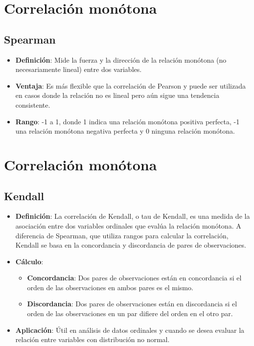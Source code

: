\documentclass[
  letterpaper,
  DIV=11,
  numbers=noendperiod]{scrreprt}
\providecommand{\tightlist}{%
  \setlength{\itemsep}{0pt}\setlength{\parskip}{0pt}}\usepackage{longtable,booktabs,array}
\begin{document}
\section{Correlación monótona}\label{correlaciuxf3n-monuxf3tona}

\subsection{Spearman}\label{spearman}

\begin{itemize}
\tightlist
\item
  \textbf{Definición}: Mide la fuerza y la dirección de la relación
  monótona (no necesariamente lineal) entre dos variables.
\item
  \textbf{Ventaja}: Es más flexible que la correlación de Pearson y
  puede ser utilizada en casos donde la relación no es lineal pero aún
  sigue una tendencia consistente.
\item
  \textbf{Rango}: -1 a 1, donde 1 indica una relación monótona positiva
  perfecta, -1 una relación monótona negativa perfecta y 0 ninguna
  relación monótona.
\end{itemize}

\section{Correlación monótona}\label{correlaciuxf3n-monuxf3tona-1}

\subsection{Kendall}\label{kendall}

\begin{itemize}
\tightlist
\item
  \textbf{Definición}: La correlación de Kendall, o tau de Kendall, es
  una medida de la asociación entre dos variables ordinales que evalúa
  la relación monótona. A diferencia de Spearman, que utiliza rangos
  para calcular la correlación, Kendall se basa en la concordancia y
  discordancia de pares de observaciones.
\item
  \textbf{Cálculo}:

  \begin{itemize}
  \tightlist
  \item
    \textbf{Concordancia}: Dos pares de observaciones están en
    concordancia si el orden de las observaciones en ambos pares es el
    mismo.
  \item
    \textbf{Discordancia}: Dos pares de observaciones están en
    discordancia si el orden de las observaciones en un par difiere del
    orden en el otro par.
  \end{itemize}
\item
  \textbf{Aplicación}: Útil en análisis de datos ordinales y cuando se
  desea evaluar la relación entre variables con distribución no normal.
\end{itemize}
\end{document}
